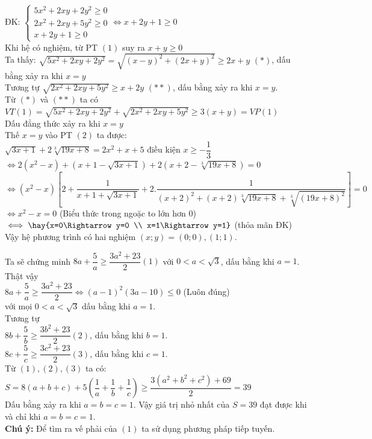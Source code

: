 \lgi
ĐK: $\begin{cases} 5x^2+2xy+2y^2\ge 0\\ 2x^2+2xy+5y^2\ge 0\\
x+2y+1\ge 0 \end{cases}\iff x+2y+1\ge 0$\\
Khi hệ có nghiệm, từ PT $(1)$ suy ra $x+y\ge 0$\\
Ta thấy: $\sqrt{5x^2+2xy+2y^2}=\sqrt{(x-y)^2+(2x+y)^2}\ge 2x+y$ $(*)$, dấu bằng xảy ra khi $x=y$\\
Tương tự $\sqrt{2x^2+2xy+5y^2}\ge x+2y$ $(**)$, dấu bằng xảy ra khi $x=y$.\\
Từ $(*)$ và $(**)$ ta có
$VT(1)=\sqrt{5x^2+2xy+2y^2}+\sqrt{2x^2+2xy+5y^2}\ge 3(x+y)=VP(1)$\\
Dấu đẳng thức xảy ra khi $x=y$\\
Thế $x=y$ vào PT $(2)$ ta được:\\
$\sqrt{3x+1}+2\sqrt[3]{19x+8}=2x^2+x+5$ điều kiện $x\ge -\dfrac{1}{3}$\\
$\iff 2(x^2-x)+\left ( x+1-\sqrt{3x+1}\right )+2\left(x+2-\sqrt[3]{19x+8}\right)=0$\\
$\iff (x^2-x)\left[2+\dfrac{1}{x+1+\sqrt{3x+1}}+2.\dfrac{1}{(x+2)^2+(x+2)\sqrt[3]{19x+8}+\sqrt[3]{(19x+8)^2}}\right]=0$\\
$\iff x^2-x=0$ (Biểu thức trong ngoặc to lớn hơn $0$)\\
$\iff \hay{x=0\Rightarrow y=0 \\ x=1\Rightarrow y=1}$ (thỏa mãn ĐK)\\
Vậy hệ phương trình có hai nghiệm $(x;y)=(0;0),(1;1)$. 

\lgi 
Ta sẽ chứng minh $8a+\dfrac{5}{a}\ge \dfrac{3a^2+23}{2}(1)$ với $0<a<\sqrt{3}$, dấu bằng khi $a=1$. Thật vậy\\
$8a+\dfrac{5}{a}\ge \dfrac{3a^2+23}{2}\iff (a-1)^2(3a-10)\le 0$ (Luôn đúng) \\ 
với mọi $0<a<\sqrt{3}$ dấu bằng khi $a=1$.\\
Tương tự\\
$8b+\dfrac{5}{b}\ge \dfrac{3b^2+23}{2}(2)$, dấu bằng khi $b=1$.\\
$8c+\dfrac{5}{c}\ge \dfrac{3c^2+23}{2}(3)$, dấu bằng khi $c=1$.\\
Từ $(1),(2),(3)$ ta có:\\ $S=8(a+b+c)+5\left(\dfrac{1}{a}+\dfrac{1}{b}+\dfrac{1}{c}\right)\ge \dfrac{3(a^2+b^2+c^2)+69}{2}=39$\\
Dấu bằng xảy ra khi $a=b=c=1$.
Vậy giá trị nhỏ nhất của $S=39$ đạt được  khi và chỉ khi $a=b=c=1$.\\
\textbf{Chú ý:} Để tìm ra vế phải của $(1)$ ta sử dụng phương pháp tiếp tuyến.\\

